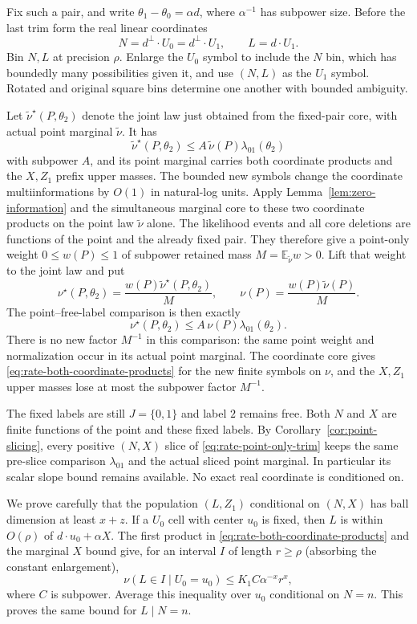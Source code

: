 Fix such a pair, and write $\theta_1-\theta_0=\alpha d$, where
$\alpha^{-1}$ has subpower size.  Before the last trim form the
real linear coordinates
\[
 N=d^\perp\cdot U_0=d^\perp\cdot U_1,\qquad
 L=d\cdot U_1.
\]
Bin $N,L$ at precision $\rho$.  Enlarge the $U_0$ symbol to
include the $N$ bin, which has boundedly many possibilities given
it, and use $(N,L)$ as the $U_1$ symbol.  Rotated and original
square bins determine one another with bounded ambiguity.

Let $\widetilde\nu^\star(P,\theta_2)$ denote the joint law just obtained
from the fixed-pair core, with actual point marginal $\widetilde\nu$.
It has
\[
 \widetilde\nu^\star(P,\theta_2)
 \le A\,\widetilde\nu(P)\lambda_{01}(\theta_2)
\]
with subpower $A$, and its point marginal carries both coordinate
products and the $X,Z_1$ prefix upper masses.  The bounded new
symbols change the coordinate multiinformations by $O(1)$ in
natural-log units.  Apply Lemma~\ref{lem:zero-information} and the
simultaneous marginal core to these two coordinate products on
the point law $\widetilde\nu$ alone.  The likelihood events and
all core deletions are functions of the point and the already fixed
pair.  They therefore give a point-only weight $0\le w(P)\le1$ of
subpower retained mass
$M=\mathbb E_{\widetilde\nu}w>0$.  Lift that weight to the joint
law and put
\[
 \nu^\star(P,\theta_2)=\frac{w(P)\widetilde\nu^\star(P,\theta_2)}M,
 \qquad
 \nu(P)=\frac{w(P)\widetilde\nu(P)}M.
\]
The point--free-label comparison is then exactly
\begin{equation}
 \nu^\star(P,\theta_2)
 \le A\,\nu(P)\lambda_{01}(\theta_2).
 \label{eq:rate-point-only-trim}
\end{equation}
There is no new factor $M^{-1}$ in this comparison: the same point
weight and normalization occur in its actual point marginal.
The coordinate core gives \eqref{eq:rate-both-coordinate-products}
for the new finite symbols on $\nu$, and the
$X,Z_1$ upper masses lose at most the subpower factor $M^{-1}$.

The fixed labels are still $J=\{0,1\}$ and label $2$ remains free.
Both $N$ and $X$ are finite functions of the point and these fixed
labels.  By Corollary~\ref{cor:point-slicing}, every positive
$(N,X)$ slice of \eqref{eq:rate-point-only-trim} keeps the same
pre-slice comparison $\lambda_{01}$ and the actual sliced point
marginal.  In particular its scalar slope bound remains available.
No exact real coordinate is conditioned on.

We prove carefully that the population $(L,Z_1)$ conditional on
$(N,X)$ has ball dimension at least $x+z$. If a $U_0$ cell with center
$u_0$ is fixed, then $L$ is within $O(\rho)$ of
$d\cdot u_0+\alpha X$. The first product in
\eqref{eq:rate-both-coordinate-products} and the marginal $X$ bound
give, for an interval $I$ of length $r\ge\rho$ (absorbing the
constant enlargement),
\begin{equation}\label{eq:rate-L-slice}
 \nu(L\in I\mid U_0=u_0)
        \le K_1 C\alpha^{-x}r^x,
\end{equation}
where $C$ is subpower. Average this inequality over $u_0$ conditional
on $N=n$. This proves the same bound for $L\mid N=n$.

